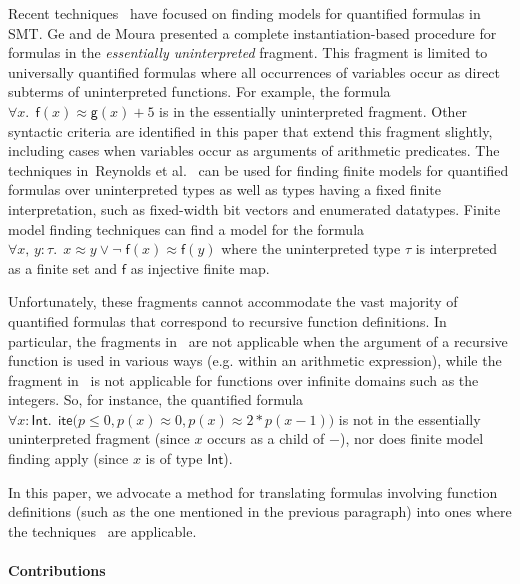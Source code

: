 \documentclass[runningheads,a4paper]{llncs}
\newcommand{\con}[1]{\mathsf{#1}}
\let\oldneg=\neg
\def\neg{\oldneg\;}
\let\oldvee=\vee
\def\vee{\mathrel{\oldvee}}
\newcommand{\teq}{\approx}
\newcommand{\sortint}{\ty{Int}}
\newcommand\ty[1]{\con{#1}}
\newcommand{\lite}{\con{ite}}
\newcommand{\vthinspace}{\kern+0.083333em}
\newcommand{\typ}[1]{^{\vthinspace #1}}
\begin{document}
Recent techniques~\cite{GeDeM-CAV-09, ReyEtAl-1-RR-13,reynolds-et-al-2013}
have focused on finding models for quantified formulas in SMT.
Ge and de Moura \cite{GeDeM-CAV-09} presented a complete instantiation-based
procedure for formulas in the \emph{essentially uninterpreted} fragment.
This fragment is limited to universally quantified formulas where all
occurrences of variables occur as direct subterms of uninterpreted
functions. For example, the formula $\forall x%
.\;\, \con{f}( x )
\teq \con{g}( x ) + 5$ is in the essentially uninterpreted fragment.
Other syntactic criteria are identified in this paper that extend
this fragment slightly, including cases when variables occur as arguments of
arithmetic predicates. The techniques in~Reynolds et al.\
\cite{ReyEtAl-1-RR-13,reynolds-et-al-2013} can be used for finding finite
models for quantified
formulas over uninterpreted types as well as types having a fixed finite
interpretation, such as fixed-width bit vectors and enumerated datatypes.
Finite model finding techniques can
find a model for the formula $\forall x,\, y : \tau.\;\, x \teq
y \vee \neg \con{f}( x ) \teq \con{f}( y )$ where the uninterpreted type $\tau$ is
interpreted as a finite set and $\con{f}$ as injective finite map.

Unfortunately, these fragments cannot accommodate the vast majority of
quantified formulas that correspond to recursive function definitions.
In particular, the fragments in~\cite{GeDeM-CAV-09} are not applicable when the argument of a recursive function is used in various ways (e.g. within an arithmetic expression),
while the fragment in~\cite{ReyEtAl-1-RR-13,reynolds-et-al-2013} is not applicable for functions over infinite domains such as the integers.
So, for instance, the quantified formula $\forall x : {\sortint}.\;\, \lite\bigl( p \leq 0, p( x ) \teq 0, p( x ) \teq 2 * p( x - 1 ) \bigr)$
is not in the essentially uninterpreted fragment (since $x$ occurs as a child of $-$),
nor does finite model finding apply (since $x$ is of type $\sortint$).

In this paper, we advocate a method for translating formulas involving function
definitions (such as the one mentioned in the previous paragraph) 
into ones where the techniques~\cite{GeDeM-CAV-09, ReyEtAl-1-RR-13} are applicable.

\paragraph{Contributions}
\end{document}
